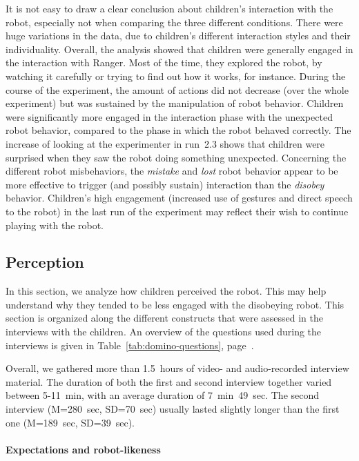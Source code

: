 \documentclass{sig-alternate}
\begin{document}
It is not easy to draw a clear conclusion about children's interaction with the
robot, especially not when comparing the three different conditions. There were
huge variations in the data, due to children's different interaction styles and
their individuality. Overall, the analysis showed that children were generally
engaged in the interaction with Ranger. Most of the time, they explored the
robot, by watching it carefully or trying to find out how it works, for
instance. During the course of the experiment, the amount of actions did not
decrease (over the whole experiment) but was sustained by the manipulation of
robot behavior. Children were significantly more engaged in the interaction
phase with the unexpected robot behavior, compared to the phase in which the
robot behaved correctly. The increase of looking at the experimenter in run~2.3
shows that children were surprised when they saw the robot doing something
unexpected. Concerning the different robot misbehaviors, the \textit{mistake}
and \textit{lost} robot behavior appear to be more effective to trigger (and
possibly sustain) interaction than the \textit{disobey} behavior. Children's
high engagement (increased use of gestures and direct speech to the robot) in
the last run of the experiment may reflect their wish to continue playing with
the robot.


\subsection{Perception}

In this section, we analyze how children perceived the robot. This may help
understand why they tended to be less engaged with the disobeying robot. This
section is organized along the different constructs that were assessed in the
interviews with the children. An overview of the questions used during the
interviews is given in Table~\ref{tab:domino-questions},
page~\pageref{tab:domino-questions}.

Overall, we gathered more than 1.5~hours of video- and audio-recorded interview
material. The duration of both the first and second interview together varied
between 5-11~min, with an average duration of 7~min~49~sec. The second interview
(M=280~sec, SD=70~sec) usually lasted slightly longer than the first one
(M=189~sec, SD=39~sec).


\paragraph{Expectations and robot-likeness}
\end{document}

